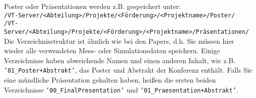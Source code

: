 \noindent Poster oder Präsentationen werden z.B. gespeichert unter: \\
\texttt{/VT-Server/<Abteilung>/Projekte/<Förderung>/<Projektname>/Poster/} \\
\texttt{/VT-Server/<Abteilung>/Projekte/<Förderung>/<Projektname>/Präsentationen/} \\
%
Die Verzeichnisstruktur ist ähnlich wie bei den Papers, d.h. Sie müssen hier
wieder alle verwendeten Mess- oder Simulationsdaten speichern. Einige
Verzeichnisse haben abweichende Namen und einen anderen Inhalt, wie z.B.
\texttt{'01\_Poster+Abstrakt'}, das Poster und Abstrakt der Konferenz enthält.
Falls Sie eine mündliche Präsentation gehalten haben, heißen die ersten beiden
Verzeichnisse \texttt{'00\_FinalPresentation'} und
\texttt{'01\_Praesentation+Abstrakt'}.
\begin{table}[!h]
  \caption{%
  Die Daten jedes Beitrags müssen in sieben Unterverzeichnissen gespeichert
  werden; weitere Hinweise: \\
  ** Wenn das Poster präsentiert wurde, lädt der jeweilige Präsentator die
  letzte und überarbeitete Version (d.h. nur die wirklich verwendeten, aber
  absolut vollständigen Daten) in das geschützte Verzeichnis \\
  ***Wenn die in einer Abbildung/Tabelle wiedergegebenen Daten aus verteilten
  Rohdatenverzeichnissen stammt, genügt es, hier nur das erzeugende Programm zu
  speichern%
  }

\label{table:poster-directory-structure}
\end{table}
